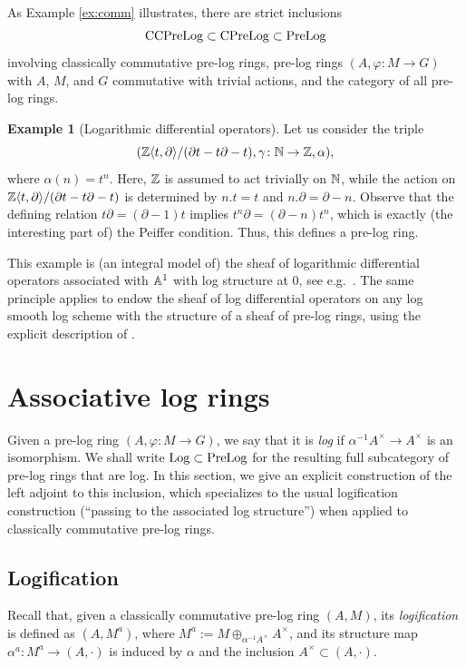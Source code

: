 \documentclass[a4paper,10pt%
]{amsart}
\numberwithin{equation}{section}
\theoremstyle{definition}
\newtheorem{example}[subsection]{Example}
\renewcommand{\:}{\colon}
\begin{document}
As Example \ref{ex:comm} illustrates, there are strict inclusions \[{\rm CCPreLog} \subset {\rm CPreLog} \subset {\rm PreLog}\] involving classically commutative pre-log rings, pre-log rings $(A, \varphi \colon M \to G)$ with $A$, $M$, and $G$ commutative with trivial actions, and the category of all pre-log rings. 

\begin{example}[Logarithmic differential operators] Let us consider the triple \[({\Bbb Z}\langle t, \partial \rangle / (\partial t - t\partial - t), \gamma \colon {\Bbb N} \to {\Bbb Z}, \alpha),\] where $\alpha(n) = t^n$. Here, ${\Bbb Z}$ is assumed to act trivially on ${\Bbb N}$, while the action on ${\Bbb Z}\langle t, \partial \rangle / (\partial t - t\partial - t)$ is determined by $n.t = t$ and $n.\partial = \partial - n$. Observe that the defining relation $t\partial = (\partial - 1)t$ implies $t^n\partial = (\partial - n)t^n$, which is exactly (the interesting part of) the Peiffer condition. Thus, this defines a pre-log ring. 

This example is (an integral model of) the sheaf of logarithmic differential operators associated with ${\Bbb A}^1$ with log structure at $0$, see e.g.\ \cite[Example 3.3]{KT19}. The same principle applies to endow the sheaf of log differential operators on any log smooth log scheme with the structure of a sheaf of pre-log rings, using the explicit description of \cite[Corollary 3.2]{KT19}.  
\end{example}


\section{Associative log rings}\label{sec:asslog} Given a pre-log ring $(A, \varphi \colon M \to G)$, we say that it is \emph{log} if $\alpha^{-1}A^\times \to A^\times$ is an isomorphism. We shall write ${\rm Log} \subset {\rm PreLog}$ for the resulting full subcategory of pre-log rings that are log. In this section, we give an explicit construction of the left adjoint to this inclusion, which specializes to the usual logification construction (``passing to the associated log structure'') when applied to classically commutative pre-log rings. 

\subsection{Logification} Recall that, given a classically commutative pre-log ring $(A, M)$, its \emph{logification} is defined as $(A, M^a)$, where $M^a := M \oplus_{\alpha^{-1}A^\times} A^\times$, and its structure map $\alpha^a \colon M^a \to (A, \cdot)$ is induced by $\alpha$ and the inclusion $A^\times \subset (A, \cdot)$.
\end{document}
